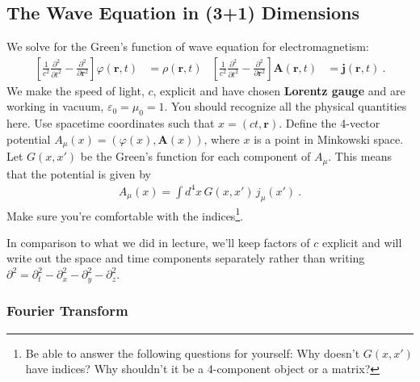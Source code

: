 \documentclass[12pt]{article}
\numberwithin{equation}{subsection}    %
\renewcommand{\vec}[1]{\mathbf{#1}} %
\begin{document}

\subsection{The Wave Equation in (3+1) Dimensions}
\label{problem:wave:eq:3d}

We solve for the Green's function of wave equation for electromagnetism: 
\begin{align}
	\left[\frac{1}{c^2}\frac{\partial^2}{\partial t^2} - \frac{\partial^2}{\partial \vec{r}^2}\right] 
	\varphi(\vec{r},t) &= \rho(\vec{r},t)
	&
	\left[\frac{1}{c^2}\frac{\partial^2}{\partial t^2} - \frac{\partial^2}{\partial \vec{r}^2}\right]
	\vec A(\vec{r},t) &= \vec j(\vec{r},t) \ .
	\label{eq:EM:wave}
\end{align}
We make the speed of light, $c$, explicit and have chosen \textbf{Lorentz gauge} and are working in vacuum, $\varepsilon_0 = \mu_0 = 1$. 
%
You should recognize all the physical quantities here. 
% 
Use spacetime coordinates such that $x = (ct,\vec r)$. Define the 4-vector potential $A_\mu(x) = \left(\varphi(x),\vec A(x)\right)$, where $x$ is a point in Minkowski space. Let $G(x,x')$ be the Green's function for each component of $A_\mu$. 
%
This means that the potential is given by
\begin{align}
	A_\mu(x) = \int d^4x \, G(x,x') \, j_\mu(x') \ .
\end{align}
Make sure you're comfortable with the indices\footnote{Be able to answer the following questions for yourself: Why doesn't $G(x,x')$ have indices? Why shouldn't it be a 4-component object or a matrix?}. 

In comparison to what we did in lecture, we'll keep factors of $c$ explicit and will write out the space and time components separately rather than writing $\partial^2 = \partial_t^2 -\partial_x^2 -\partial_y^2 -\partial_z^2$.




\subsubsection{Fourier Transform}
\end{document}
